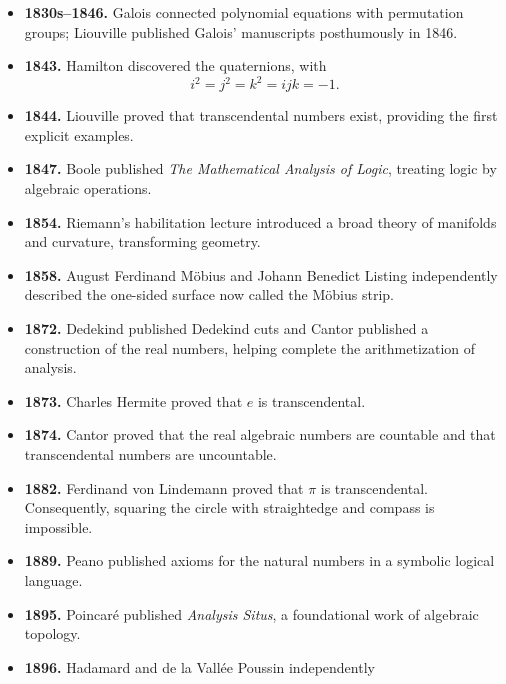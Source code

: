 \begin{itemize}
              constructions of hyperbolic geometry. Gauss had developed related
              ideas without publishing a systematic account; Riemann's 1854
              lecture later broadened geometry through manifolds and curvature.
        \item \textbf{1830s--1846.} Galois connected polynomial equations with
              permutation groups; Liouville published Galois' manuscripts
              posthumously in 1846.
        \item \textbf{1843.} Hamilton discovered the quaternions, with
              \[
                  i^2=j^2=k^2=ijk=-1.
              \]
        \item \textbf{1844.} Liouville proved that transcendental numbers exist,
              providing the first explicit examples.
        \item \textbf{1847.} Boole published
              \textit{The Mathematical Analysis of Logic}, treating logic by
              algebraic operations.
        \item \textbf{1854.} Riemann's habilitation lecture introduced a broad
              theory of manifolds and curvature, transforming geometry.
        \item \textbf{1858.} August Ferdinand Möbius and Johann Benedict
              Listing independently described the one-sided surface now called
              the Möbius strip.
        \item \textbf{1872.} Dedekind published Dedekind cuts and Cantor
              published a construction of the real numbers, helping complete
              the arithmetization of analysis.
        \item \textbf{1873.} Charles Hermite proved that $e$ is transcendental.
        \item \textbf{1874.} Cantor proved that the real algebraic numbers are
              countable and that transcendental numbers are uncountable.
        \item \textbf{1882.} Ferdinand von Lindemann proved that $\pi$ is
              transcendental. Consequently, squaring the circle with straightedge
              and compass is impossible.
        \item \textbf{1889.} Peano published axioms for the natural numbers in
              a symbolic logical language.
        \item \textbf{1895.} Poincaré published \textit{Analysis Situs}, a
              foundational work of algebraic topology.
        \item \textbf{1896.} Hadamard and de la Vallée Poussin independently

\end{itemize}
